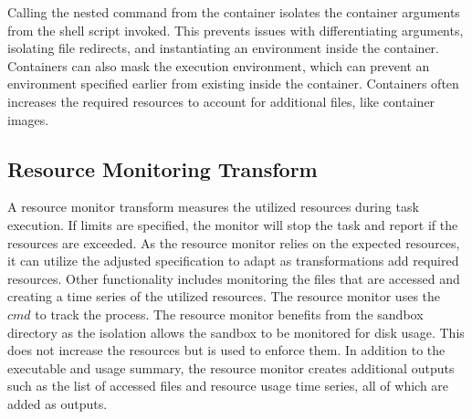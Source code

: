 \documentclass[conference]{IEEEtran}
\begin{document}
Calling the nested command from the container
isolates the container arguments from the shell
script invoked. This prevents issues with 
differentiating arguments, isolating file
redirects, and instantiating an environment
inside the container.
Containers can also mask the execution environment,
which can prevent an environment specified earlier from
existing inside the container. 
Containers often increases the required resources
to account for additional files,
like container images.

\subsection{Resource Monitoring Transform}

A resource monitor transform measures the utilized resources 
during task execution. 
If limits are specified, 
the monitor will stop the task and 
report if the resources are exceeded. 
As the resource monitor relies on the 
expected resources, it can utilize the 
adjusted specification to adapt
as transformations add required resources.
Other functionality includes 
monitoring the files that are accessed and 
creating a time series of the
utilized resources.
The resource monitor uses the $cmd$ 
to track the process. 
The resource monitor benefits from the 
sandbox directory as the isolation allows 
the sandbox to be monitored for disk usage.
This does not increase the resources
but is used to enforce them.
In addition to the executable and usage summary, 
the resource monitor creates additional outputs
such as the list of accessed files and 
resource usage time series, all of which
are added as outputs.
\end{document}
